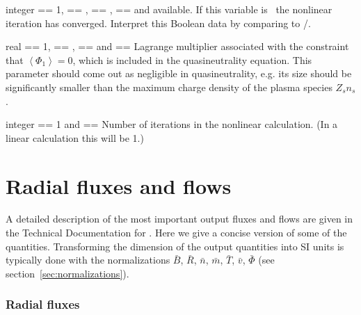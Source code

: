 \myhrule

{integer}
{ == 1,  == \true,  == \true,  == \false and  available.}
{If this variable is \true~the nonlinear iteration has converged. Interpret this Boolean data by comparing to /.}

\myhrule

{real}
{ == 1,  == \true,  == \true and  == \false}
{Lagrange multiplier associated with the constraint that $\left\langle \Phi_1\right\rangle = 0$, which is included in the quasineutrality equation. %
This parameter should come out as negligible in quasineutrality, e.g. its size should be significantly smaller than the maximum charge density of the plasma species $Z_s n_s$.
}

\myhrule

{integer}
{ == 1 and  == \true}
{Number of iterations in the nonlinear calculation. (In a linear calculation this will be 1.)}

\myhrule



\section{Radial fluxes and flows}
\label{sec:RadialFluxesAndFlows}

A detailed description of the most important output fluxes and flows are given in the Technical Documentation for \sfincs. 
Here we give a concise version of some of the quantities. 
Transforming the dimension of the output quantities into SI units is typically done with the normalizations 
$\bar{B}$, $\bar{R}$, $\bar{n}$, $\bar{m}$, $\bar{T}$, $\bar{v}$, $\bar{\Phi}$ (see section~\ref{sec:normalizations}). 

\subsubsection{Radial fluxes}


